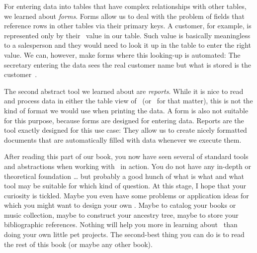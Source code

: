 For entering data into tables that have complex relationships with other tables, we learned about \emph{forms}.
Forms allow us to deal with the problem of fields that reference rows in other tables via their primary keys.
A customer, for example, is represented only by their ~value in our  table.
Such value is basically meaningless to a salesperson and they would need to look it up in the  table to enter the right value.
We can, however, make forms where this looking-up is automated:
The secretary entering the data sees the real customer name but what is stored is the customer~.

The second abstract tool we learned about are \emph{reports}.
While it is nice to read and process data in either the table view of \libreofficeBase\ (or \microsoftAccess\ for that matter), this is not the kind of format we would use when printing the data.
A form is also not suitable for this purpose, because forms are designed for entering data.
Reports are the tool exactly designed for this use case:
They allow us to create nicely formatted documents that are automatically filled with data whenever we execute them.

After reading this part of our book, you now have seen several of standard tools and abstractions when working with \dbs\ in action.
You do not have any in-depth or theoretical foundation {\dots} but probably a good hunch of what is what and what tool may be suitable for which kind of question.
At this stage, I hope that your curiosity is tickled.
Maybe you even have some problems or application ideas for which you might want to design your own \db.
Maybe to catalog your books or music collection, maybe to construct your ancestry tree, maybe to store your bibliographic references.
Nothing will help you more in learning about \dbs\ than doing your own little pet projects.
The second-best thing you can do is to read the rest of this book (or maybe any other book).%
%
\endhsection%
%
